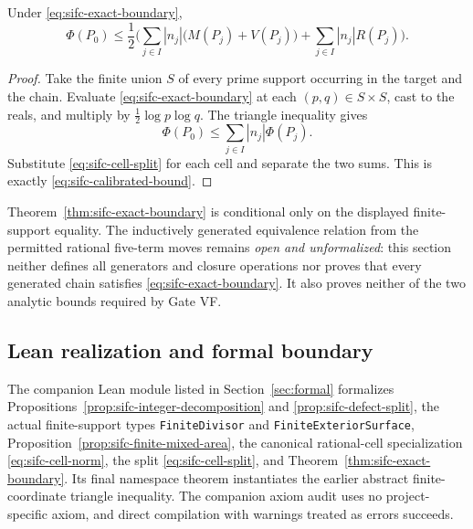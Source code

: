 \begin{theorem}
\label{thm:sifc-exact-boundary}
Under \eqref{eq:sifc-exact-boundary},
\begin{equation}
 \Phi(P_0)\leq\frac12\biggl(
   \sum_{j\in I}|n_j|\bigl(M(P_j)+V(P_j)\bigr)
   +\sum_{j\in I}|n_j|R(P_j)
 \biggr).
 \label{eq:sifc-calibrated-bound}
\end{equation}
\end{theorem}

\begin{proof}
Take the finite union $S$ of every prime support occurring in the target
and the chain.  Evaluate \eqref{eq:sifc-exact-boundary} at each
$(p,q)\in S\times S$, cast to the reals, and multiply by
$\frac12\log p\log q$.  The triangle inequality gives
\[
 \Phi(P_0)\leq\sum_{j\in I}|n_j|\Phi(P_j).
\]
Substitute \eqref{eq:sifc-cell-split} for each cell and separate the two
sums.  This is exactly \eqref{eq:sifc-calibrated-bound}.
\end{proof}

Theorem~\ref{thm:sifc-exact-boundary} is conditional only on the displayed
finite-support equality.  The inductively generated equivalence relation
from the permitted rational five-term moves remains \emph{open and
unformalized}: this section neither defines all generators and closure
operations nor proves that every generated chain satisfies
\eqref{eq:sifc-exact-boundary}.  It also proves neither of the two analytic
bounds required by Gate VF.

\subsection{Lean realization and formal boundary}

The companion Lean module listed in Section~\ref{sec:formal}
formalizes Propositions~\ref{prop:sifc-integer-decomposition} and
\ref{prop:sifc-defect-split}, the actual finite-support types
\texttt{FiniteDivisor} and \texttt{FiniteExteriorSurface},
Proposition~\ref{prop:sifc-finite-mixed-area}, the canonical rational-cell
specialization \eqref{eq:sifc-cell-norm}, the split
\eqref{eq:sifc-cell-split}, and
Theorem~\ref{thm:sifc-exact-boundary}.  Its final namespace theorem
instantiates the earlier abstract finite-coordinate triangle inequality.
The companion axiom audit
uses no project-specific axiom, and direct compilation with warnings treated
as errors succeeds.
